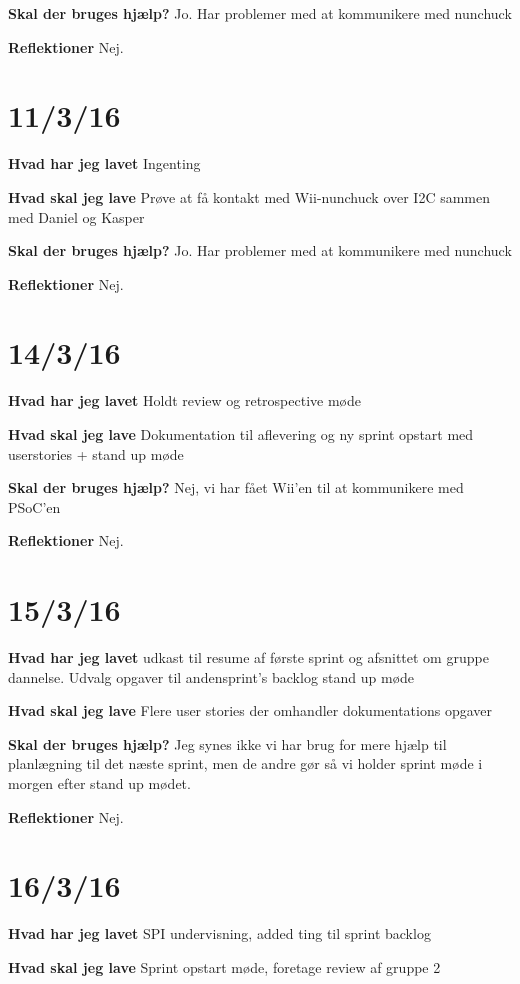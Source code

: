 \documentclass{article}
\begin{document}
	\textbf{Skal der bruges hjælp?}
	Jo. Har problemer med at kommunikere med nunchuck
	
	\textbf{Reflektioner}
	Nej.		
	
	\section{11/3/16}
	\textbf{Hvad har jeg lavet}
	Ingenting
	
	\textbf{Hvad skal jeg lave}
	Prøve at få kontakt med Wii-nunchuck over I2C sammen med Daniel og Kasper
	
	\textbf{Skal der bruges hjælp?}
	Jo. Har problemer med at kommunikere med nunchuck
	
	\textbf{Reflektioner}
	Nej.
	
	\section{14/3/16}
	\textbf{Hvad har jeg lavet}
	Holdt review og retrospective møde
	
	\textbf{Hvad skal jeg lave}
	Dokumentation til aflevering og ny sprint opstart med userstories + stand up møde
	
	\textbf{Skal der bruges hjælp?}
	Nej, vi har fået Wii'en til at kommunikere med PSoC'en
	
	\textbf{Reflektioner}
	Nej.
	
	\section{15/3/16}
	\textbf{Hvad har jeg lavet}
	udkast til resume af første sprint og afsnittet om gruppe dannelse.
	Udvalg opgaver til andensprint's backlog
	stand up møde 
	
	\textbf{Hvad skal jeg lave}
	Flere user stories der omhandler dokumentations opgaver
	
	
	\textbf{Skal der bruges hjælp?}
	Jeg synes ikke vi har brug for mere hjælp til planlægning til det næste sprint, men de andre gør så vi holder sprint møde i morgen efter stand up mødet.
	
	\textbf{Reflektioner}
	Nej.
	
	\section{16/3/16}
	\textbf{Hvad har jeg lavet}
	SPI undervisning, added ting til sprint backlog 
	
	\textbf{Hvad skal jeg lave}
	Sprint opstart møde, foretage review af gruppe 2
	
\end{document}
